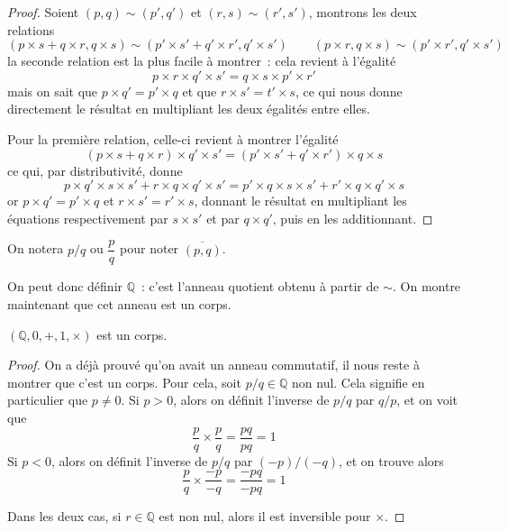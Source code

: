\begin{proof}
  Soient $(p,q)\sim(p',q')$ et $(r,s)\sim(r',s')$, montrons les deux relations
  \[(p\times s + q\times r, q \times s) \sim
  (p'\times s' + q'\times r',q'\times s')\qquad
  (p\times r, q\times s)\sim(p'\times r', q'\times s')\]
  la seconde relation est la plus facile à montrer~: cela revient à l'égalité
  \[p\times r \times q' \times s' = q\times s \times p' \times r'\]
  mais on sait que $p\times q' = p' \times q$ et que
  $r \times s' = t' \times s$, ce qui nous donne directement le résultat en
  multipliant les deux égalités entre elles.

  Pour la première relation, celle-ci revient à montrer l'égalité
  \[(p\times s + q \times r)\times q' \times s' =
  (p'\times s' + q' \times r')\times q \times s\]
  ce qui, par distributivité, donne
  \[p\times q' \times s \times s' + r \times q \times q' \times s' =
  p'\times q \times s \times s' + r' \times q \times q' \times s\]
  or $p\times q' = p' \times q$ et $r\times s' = r' \times s$, donnant le
  résultat en multipliant les équations respectivement par $s\times s'$ et par
  $q\times q'$, puis en les additionnant.
\end{proof}

\begin{notation}
  On notera $p/q$ ou $\dfrac{p}{q}$ pour noter $\overline{(p,q)}$.
\end{notation}

On peut donc définir $\mathbb Q$~: c'est l'anneau quotient obtenu à partir de
$\sim$. On montre maintenant que cet anneau est un corps.

\begin{proposition}
  $(\mathbb Q,0,+,1,\times)$ est un corps.
\end{proposition}

\begin{proof}
  On a déjà prouvé qu'on avait un anneau commutatif, il nous reste à montrer que
  c'est un corps. Pour cela, soit $p/q\in\mathbb Q$ non nul. Cela signifie en
  particulier que $p \neq 0$. Si $p > 0$, alors on définit l'inverse
  de $p/q$ par $q/p$, et on voit que
  \[\frac{p}{q}\times\frac{p}{q} = \frac{pq}{pq} = 1\]
  Si $p < 0$, alors on définit l'inverse de $p/q$ par $(-p)/(-q)$, et on
  trouve alors
  \[\frac{p}{q}\times\frac{-p}{-q} = \frac{-pq}{-pq} = 1\]

  Dans les deux cas, si $r\in \mathbb Q$ est non nul, alors il est inversible
  pour $\times$.
\end{proof}

